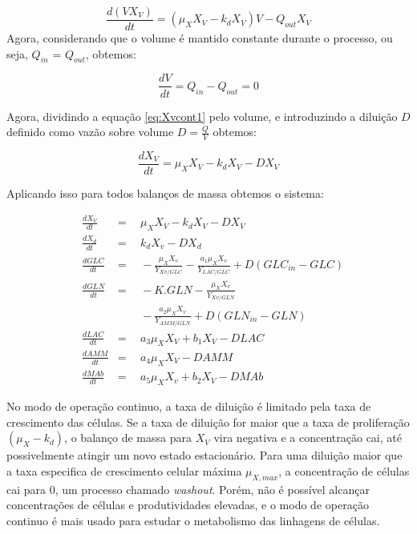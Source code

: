 \documentclass[fleqn,10pt]{SelfArx} %
\begin{document}
\begin{equation}
\frac{d(VX_V)}{dt} = \left( \mu _X X_V -k_d X_V \right) V -Q_{out}X_V\label{eq:Xvcont1}
\end{equation}
Agora, considerando que o volume é mantido constante durante o processo, ou seja, $Q_{in}$ = $Q_{out}$, obtemos: 

\begin{equation}
\frac{dV}{dt} = Q_{in} - Q_{out} = 0 \label{eq:Vcont0}
\end{equation}

Agora, dividindo a equação \ref{eq:Xvcont1} pelo volume, e introduzindo a diluição $D$ definido como vazão sobre volume $D = \frac{Q}{V}$ obtemos:

\begin{equation}
\frac{dX_V}{dt} = \mu _X X_V -k_d X_V -DX_V \label{eq:Xvcont2}
\end{equation}

Aplicando isso para todos balanços de massa obtemos o sistema:

\begin{subequations} \label{eq:EDO3}
	\begin{align}
	&\frac{dX_V}{dt}\!\!\!\!\!\!\!\!\!\!&=& \;\, \mu _X X_V -k_d X_V -DX_V \label{eq:EDO3a}
	\\
	&\frac{dX_d}{dt}\!\!\!\!\!\!\!\!\!\!&=& \;\, k_d X_v -DX_d\label{eq:EDO3b}
	\\
	&\frac{dGLC}{dt}\!\!\!\!\!\!\!\!\!\!&=& \;\, -\frac{\mu _X X_v}{Y_{Xv/GLC}}-\frac{a_1 \mu _X X_v}{Y_{LAC/GLC}} + D (GLC_{in} -GLC) \label{eq:EDO3c}
	\\	&\frac{dGLN}{dt}\!\!\!\!\!\!\!\!\!\!&=& \;\, -K.GLN -\frac{\mu _X X_v}{Y_{Xv/GLN}} \label{eq:EDO3d} \\ & & & \;\, -\frac{a_2 \mu _X X_v}{Y_{AMM/GLN}}+ D(GLN_{in} -GLN) \nonumber
	\\
	&\frac{dLAC}{dt}\!\!\!\!\!\!\!\!\!\!&=& \;\, a_3 \mu _X X_V + b_1 X_V -DLAC \label{eq:EDO3e}
	\\
	&\frac{dAMM}{dt}\!\!\!\!\!\!\!\!\!\!&=& \;\, a_4 \mu _X X_V -DAMM \label{eq:EDO3f}
	\\
	&\frac{dMAb}{dt}\!\!\!\!\!\!\!\!\!\!&=& \;\, a_5 \mu _X X_v+b_2 X_V -DMAb \label{eq:EDO3g}
	\end{align}	
\end{subequations}

No modo de operação continuo, a taxa de diluição é limitado pela taxa de crescimento das células. Se a taxa de diluição for maior que a taxa de proliferação $(\mu _X-k_d)$, o balanço de massa para $X_V$ vira negativa e a concentração cai, até possivelmente atingir um novo estado estacionário. Para uma diluição maior que a taxa especifica de crescimento celular máxima $\mu _{X,max}$, a concentração de células cai para 0, um processo chamado \textit{washout}. Porém, não é possível alcançar concentrações de células e produtividades elevadas, e o modo de operação continuo é mais usado para estudar o metabolismo das linhagens de células.
\end{document}
